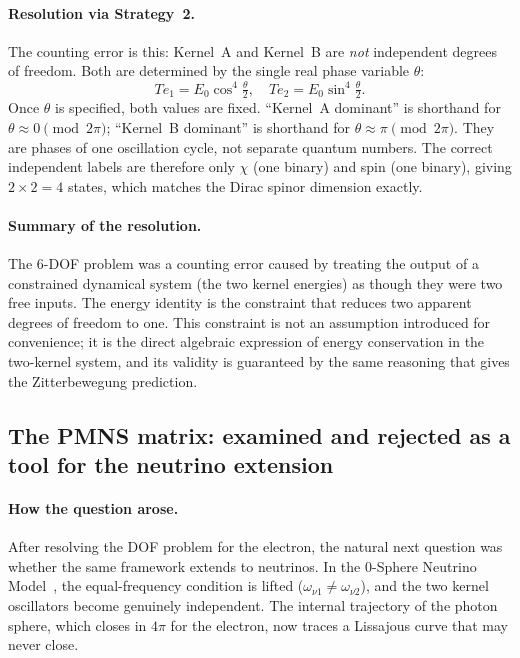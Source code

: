 \documentclass[%
 reprint, amsmath,amssymb, aps, prb, ]{revtex4-2}
\numberwithin{equation}{section}
\newcommand{\iphase}{\theta}
\begin{document}
\paragraph{Resolution via Strategy~2.}
The counting error is this: Kernel~A and Kernel~B are \emph{not} independent degrees of freedom. Both are determined by the single real phase variable $\iphase$:
\begin{equation*}
Te_1 = E_0\cos^4\!\tfrac{\iphase}{2}, \quad Te_2 = E_0\sin^4\!\tfrac{\iphase}{2}.
\end{equation*}
Once $\iphase$ is specified, both values are fixed. ``Kernel~A dominant'' is shorthand for $\iphase \approx 0 \pmod{2\pi}$; ``Kernel~B dominant'' is shorthand for $\iphase \approx \pi \pmod{2\pi}$. They are phases of one oscillation cycle, not separate quantum numbers. The correct independent labels are therefore only $\chi$ (one binary) and spin (one binary), giving $2 \times 2 = 4$ states, which matches the Dirac spinor dimension exactly.

\paragraph{Summary of the resolution.}
The 6-DOF problem was a counting error caused by treating the output of a constrained dynamical system (the two kernel energies) as though they were two free inputs. The energy identity is the constraint that reduces two apparent degrees of freedom to one. This constraint is not an assumption introduced for convenience; it is the direct algebraic expression of energy conservation in the two-kernel system, and its validity is guaranteed by the same reasoning that gives the Zitterbewegung prediction.

\subsection{The PMNS matrix: examined and rejected as a tool for the neutrino extension}
\label{app:reasoning_pmns}

\paragraph{How the question arose.}
After resolving the DOF problem for the electron, the natural next question was whether the same framework extends to neutrinos. In the 0-Sphere Neutrino Model~\cite{hanamura09}, the equal-frequency condition is lifted ($\omega_{\nu1} \neq \omega_{\nu2}$), and the two kernel oscillators become genuinely independent. The internal trajectory of the photon sphere, which closes in $4\pi$ for the electron, now traces a Lissajous curve that may never close.
\end{document}
